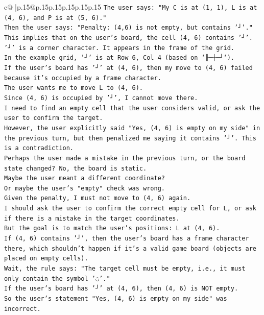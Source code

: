 \documentclass{article}
\begin{document}
{\begin{supertabular}{c@{$\;$}|p{.15\linewidth}@{}p{.15\linewidth}p{.15\linewidth}p{.15\linewidth}p{.15\linewidth}p{.15\linewidth}}
{{{\texttt{The user says: "My C is at (1, 1), L is at (4, 6), and P is at (5, 6)."} \\
\texttt{Then the user says: "Penalty: (4,6) is not empty, but contains '┘'."} \\
\texttt{This implies that on the user's board, the cell (4, 6) contains '┘'.} \\
\texttt{'┘' is a corner character. It appears in the frame of the grid.} \\
\texttt{In the example grid, '┘' is at Row 6, Col 4 (based on `╟─┼─┘`).} \\
\texttt{If the user's board has '┘' at (4, 6), then my move to (4, 6) failed because it's occupied by a frame character.} \\
\texttt{The user wants me to move L to (4, 6).} \\
\texttt{Since (4, 6) is occupied by '┘', I cannot move there.} \\
\texttt{I need to find an empty cell that the user considers valid, or ask the user to confirm the target.} \\
\texttt{However, the user explicitly said "Yes, (4, 6) is empty on my side" in the previous turn, but then penalized me saying it contains '┘'. This is a contradiction.} \\
\texttt{Perhaps the user made a mistake in the previous turn, or the board state changed? No, the board is static.} \\
\texttt{Maybe the user meant a different coordinate?} \\
\texttt{Or maybe the user's "empty" check was wrong.} \\
\texttt{Given the penalty, I must not move to (4, 6) again.} \\
\texttt{I should ask the user to confirm the correct empty cell for L, or ask if there is a mistake in the target coordinates.} \\
\texttt{But the goal is to match the user's positions: L at (4, 6).} \\
\texttt{If (4, 6) contains '┘', then the user's board has a frame character there, which shouldn't happen if it's a valid game board (objects are placed on empty cells).} \\
\texttt{Wait, the rule says: "The target cell must be empty, i.e., it must only contain the symbol '◌'."} \\
\texttt{If the user's board has '┘' at (4, 6), then (4, 6) is NOT empty.} \\
\texttt{So the user's statement "Yes, (4, 6) is empty on my side" was incorrect.} \\
}}}
\end{supertabular}}
\end{document}
